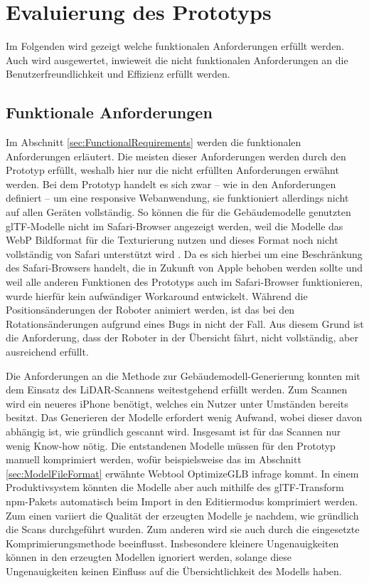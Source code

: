\newpage
\section{Evaluierung des Prototyps}
Im Folgenden wird gezeigt welche funktionalen Anforderungen erfüllt werden. Auch wird ausgewertet, inwieweit die nicht funktionalen Anforderungen an die Benutzerfreundlichkeit und Effizienz erfüllt werden.

\subsection{Funktionale Anforderungen}\label{sec:EvaluationFunctionalRequirements}
Im Abschnitt \ref{sec:FunctionalRequirements} werden die funktionalen Anforderungen erläutert. Die meisten dieser Anforderungen werden durch den Prototyp erfüllt, weshalb hier nur die nicht erfüllten Anforderungen erwähnt werden. Bei dem Prototyp handelt es sich zwar – wie in den Anforderungen definiert – um eine responsive Webanwendung, sie funktioniert allerdings nicht auf allen Geräten vollständig. So können die für die Gebäudemodelle genutzten \ac{glTF}-Modelle nicht im Safari-Browser angezeigt werden, weil die Modelle das \ac{WebP} Bildformat für die Texturierung nutzen und dieses Format noch nicht vollständig von Safari unterstützt wird \cite{CanIUseWebP}. Da es sich hierbei um eine Beschränkung des Safari-Browsers handelt, die in Zukunft von Apple behoben werden sollte und weil alle anderen Funktionen des Prototyps auch im Safari-Browser funktionieren, wurde hierfür kein aufwändiger Workaround entwickelt. Während die Positionsänderungen der Roboter animiert werden, ist das bei den Rotationsänderungen aufgrund eines Bugs in \deckgl{} nicht der Fall. Aus diesem Grund ist die Anforderung, dass der Roboter in der Übersicht fährt, nicht vollständig, aber ausreichend erfüllt.

Die Anforderungen an die Methode zur Gebäudemodell-Generierung konnten mit dem Einsatz des \ac{LiDAR}-Scannens weitestgehend erfüllt werden. Zum Scannen wird ein neueres iPhone benötigt, welches ein Nutzer unter Umständen bereits besitzt. Das Generieren der Modelle erfordert wenig Aufwand, wobei dieser davon abhängig ist, wie gründlich gescannt wird. Insgesamt ist für das Scannen nur wenig Know-how nötig. Die entstandenen Modelle müssen für den Prototyp manuell komprimiert werden, wofür beispielsweise das im Abschnitt \ref{sec:ModelFileFormat} erwähnte Webtool OptimizeGLB infrage kommt. In einem Produktivsystem könnten die Modelle aber auch mithilfe des \ac{glTF}-Transform \ac{npm}-Pakets \cite{glTF-Transform} automatisch beim Import in den Editiermodus komprimiert werden. Zum einen variiert die Qualität der erzeugten Modelle je nachdem, wie gründlich die Scans durchgeführt wurden. Zum anderen wird sie auch durch die eingesetzte Komprimierungsmethode beeinflusst. Insbesondere kleinere Ungenauigkeiten können in den erzeugten Modellen ignoriert werden, solange diese Ungenauigkeiten keinen Einfluss auf die Übersichtlichkeit des Modells haben.

